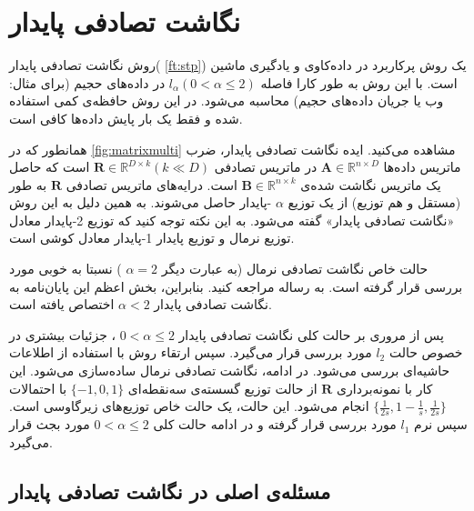 \chapter{
نگاشت تصادفی پایدار
}

روش نگاشت تصادفی پایدار(%
\autoref{ft:stp})
\cite{litez116, litez166, litez19, litez99, litez96, litez104}
یک روش پرکاربرد در داده‌کاوی و یادگیری ماشین است. با این روش به طور کارا فاصله
$l_\alpha (0 < \alpha \leq 2)$
در داده‌های حجیم (برای مثال: وب یا جریان‌ داده‌‌های حجیم) محاسبه می‌شود. در این روش حافظه‌ی کمی استفاده شده و فقط یک بار پایش داده‌ها کافی است. 

همانطور که در 
\autoref{fig:matrixmulti}
مشاهده می‌کنید. ایده نگاشت تصادفی پایدار، ضرب ماتریس داده‌ها
$\mathbf{A} \in \mathbb{R}^{n \times D}$
در ماتریس تصادفی 
$\mathbf{R} \in \mathbb{R}^{D \times k}  (k \ll D)$
است که حاصل یک ماتریس نگاشت شده‌ی 
$\mathbf{B} \in \mathbb{R}^{n \times k}$
است. درایه‌های ماتریس تصادفی 
$\mathbf{R}$
به طور 
(مستقل و هم توزیع)
از یک توزیع 
$\alpha$
-پایدار %
حاصل می‌شوند. به همین دلیل به این روش «نگاشت تصادفی پایدار» گفته می‌شود. به این نکته توجه کنید که توزیع 2-پایدار معادل توزیع نرمال و توزیع پایدار 1-پایدار معادل کوشی%
است.

حالت خاص نگاشت تصادفی نرمال (به عبارت دیگر
$\alpha = 2$
) نسبتا به خوبی مورد بررسی قرار گرفته است. به رساله
\cite{litez166}
مراجعه کنید. بنابراین، بخش اعظم این پایان‌نامه به نگاشت تصادفی پایدار 
$\alpha < 2$
اختصاص یافته است.


پس از مروری بر حالت کلی نگاشت تصادفی پایدار 
$0 < \alpha \leq 2$
، جزئیات بیشتری در خصوص حالت 
$l_2$
مورد بررسی قرار می‌گیرد. سپس ارتقاء روش با استفاده از اطلاعات حاشیه‌ای%
بررسی می‌شود. در ادامه، نگاشت تصادفی نرمال ساده‌سازی می‌شود. این کار با نمونه‌برداری 
$\mathbf{R}$
از حالت توزیع گسسته‌ی سه‌نقطه‌ای 
$\{ -1, 0, 1 \}$
با احتمالات
$\{ \frac{1}{2s} , 1- \frac{1}{s}, \frac{1}{2s} \}$
انجام می‌شود. این حالت، یک حالت خاص توزیع‌های زیرگاوسی%
است. سپس نرم 
$l_1$%
مورد بررسی قرار گرفته و در ادامه حالت کلی 
$0 < \alpha \leq 2$
مورد بجث قرار می‌گیرد.

\section{
مسئله‌ی اصلی در نگاشت تصادفی پایدار
}

